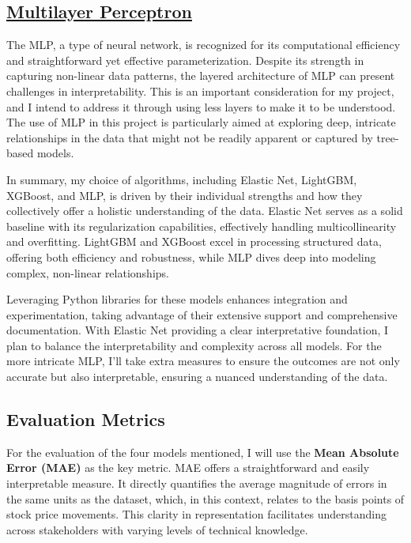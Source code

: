 \documentclass[12pt]{article}
\newtheorem{Proof of Lemma}{Proof of Lemma}
\begin{document}
\subsection*{\href{https://en.wikipedia.org/wiki/Multilayer_perceptron}{Multilayer Perceptron}}
The MLP, a type of neural network, is recognized for its computational efficiency and straightforward yet effective parameterization. Despite its strength in capturing non-linear data patterns, the layered architecture of MLP can present challenges in interpretability. This is an important consideration for my project, and I intend to address it through using less layers to make it to be understood. The use of MLP in this project is particularly aimed at exploring deep, intricate relationships in the data that might not be readily apparent or captured by tree-based models.
\newline
\newline

In summary, my choice of algorithms, including Elastic Net, LightGBM, XGBoost, and MLP, is driven by their individual strengths and how they collectively offer a holistic understanding of the data. Elastic Net serves as a solid baseline with its regularization capabilities, effectively handling multicollinearity and overfitting. LightGBM and XGBoost excel in processing structured data, offering both efficiency and robustness, while MLP dives deep into modeling complex, non-linear relationships.

Leveraging Python libraries for these models enhances integration and experimentation, taking advantage of their extensive support and comprehensive documentation. With Elastic Net providing a clear interpretative foundation, I plan to balance the interpretability and complexity across all models. For the more intricate MLP, I'll take extra measures to ensure the outcomes are not only accurate but also interpretable, ensuring a nuanced understanding of the data.

\subsection*{Evaluation Metrics}

For the evaluation of the four models mentioned, I will use the \textbf{Mean Absolute Error (MAE)} as the key metric. MAE offers a straightforward and easily interpretable measure. It directly quantifies the average magnitude of errors in the same units as the dataset, which, in this context, relates to the basis points of stock price movements. This clarity in representation facilitates understanding across stakeholders with varying levels of technical knowledge.
\end{document}
